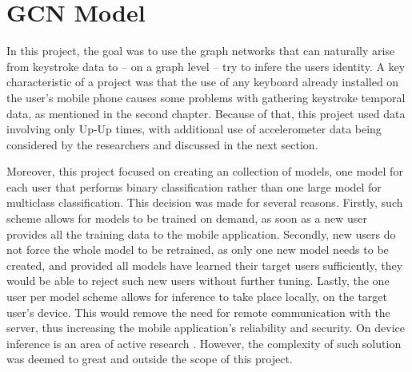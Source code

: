 \chapter{GCN Model}

In this project, the goal was to use the graph networks that can naturally arise from keystroke data to -- on a graph level -- try to infere the users identity. A key characteristic of a project was that the use of any keyboard already installed on the user's mobile phone causes some problems with gathering keystroke temporal data, as mentioned in the second chapter. Because of that, this project used data involving only Up-Up times, with additional use of accelerometer data being considered by the researchers and discussed in the next section. 

Moreover, this project focused on creating an collection of models, one model for each user that performs binary classification rather than one large model for multiclass classification. 
This decision was made for several reasons. Firstly, such scheme allows for models to be trained on demand, as soon as a new user provides all the training data to the mobile application. Secondly, new users do not force the whole model to be retrained, 
as only one new model needs to be created, and provided all models have learned their target users sufficiently, they would be able to reject such new users without further tuning. Lastly, the one user per model scheme allows for inference to take place locally, on the target user's device. This would remove the need for remote communication with the server, thus increasing the mobile application's reliability and security. On device inference is an area of active research \cite{48305}. However, the complexity of such solution was deemed to great and outside the scope of this project.
